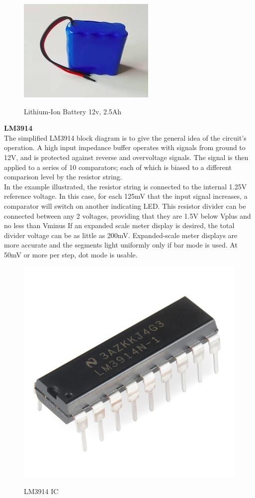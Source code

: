 \documentclass[a4paper,12pt]{article}
\begin{document}
\begin{figure}[!h]
\centering
\includegraphics[scale=0.75]{b.jpg}\\
\caption{Lithium-Ion Battery 12v, 2.5Ah}
\end{figure}
\textbf{LM3914}\\[1cm]
The simplified LM3914 block diagram is to give the general idea of the circuit's operation. A high input
impedance buffer operates with signals from ground to 12V, and is protected against reverse and overvoltage
signals. The signal is then applied to a series of 10 comparators; each of which is biased to a different
comparison level by the resistor string.\\
In the example illustrated, the resistor string is connected to the internal 1.25V reference voltage. In this case, for
each 125mV that the input signal increases, a comparator will switch on another indicating LED. This resistor
divider can be connected between any 2 voltages, providing that they are 1.5V below Vplus and no less than Vminus If
an expanded scale meter display is desired, the total divider voltage can be as little as 200mV. Expanded-scale
meter displays are more accurate and the segments light uniformly only if bar mode is used. At 50mV or more
per step, dot mode is usable.\\

\begin{figure}[!h]
\centering
\includegraphics[scale=0.3]{lm3914.jpg}\\
\caption{LM3914 IC}
\end{figure}
\end{document}
